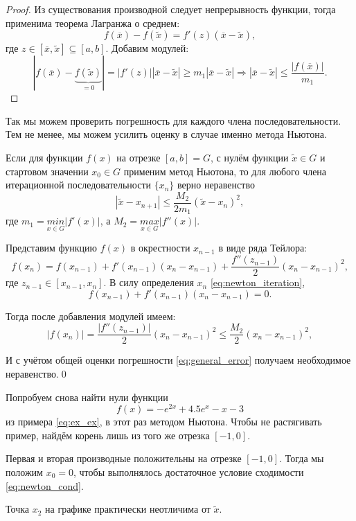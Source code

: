 \documentclass[../main.tex]{subfile}
\begin{document}
\begin{proof}
	Из существования производной следует непрерывность функции, тогда
	применима теорема Лагранжа о среднем:
	\[f(\overline{x})-f(\widetilde{x})=f'(z)(\overline{x}-\widetilde{x}),\]
	где $z\in[\overline{x},\widetilde{x}]\subseteq[a,b]$. Добавим модулей:
	\[|f(\overline{x})-\underset{=0}{\underbrace{f(\widetilde{x})}}|=|f'(z)|
		|\overline{x}-\widetilde{x}|\ge m_1|\overline{x}-\widetilde{x}|
		\Rightarrow |\overline{x}-\widetilde{x}|\le
		\frac{|f(\overline{x})|}{m_1}.\]
\end{proof}

Так мы можем проверить погрешность для каждого члена последовательности. Тем не
менее, мы можем усилить оценку в случае именно метода Ньютона.

\begin{theorem}
	Если для функции $f(x)$ на отрезке $[a,b]=G$, с нулём функции
	$\widetilde{x}\in G$ и стартовом значении $x_0\in G$ применим метод
	Ньютона, то для любого члена итерационной последовательности $\{x_n\}$
	верно неравенство
	\[\boxed{|\widetilde{x}-x_{n+1}|\le \frac{M_2}{2m_1}
	(\widetilde{x}-x_n)^2},\]
	где $m_1=\underset{x\in G}{min}|f'(x)|$, а $M_2=\underset{x\in G}{max}
	|f''(x)|$.
\end{theorem}

\beginproof

	Представим функцию $f(x)$ в окрестности $x_{n-1}$ в виде ряда Тейлора:
	\[f(x_n)=f(x_{n-1})+f'(x_{n-1})(x_n-x_{n-1})+\frac{f''(z_{n-1})}{2}
	(x_n-x_{n-1})^2,\]
	где $z_{n-1}\in[x_{n-1},x_n]$. В силу определения $x_n$
	\eqref{eq:newton_iteration},
	\[f(x_{n-1})+f'(x_{n-1})(x_n-x_{n-1})=0.\]

	Тогда после добавления модулей имеем:
	\[|f(x_n)|=\frac{|f''(z_{n-1})|}{2}(x_n-x_{n-1})^2\le \frac{M_2}{2}
	(x_n-x_{n-1})^2,\]

	И с учётом общей оценки погрешности \eqref{eq:general_error} получаем
	необходимое неравенство.\qed

\begin{example}
	Попробуем снова найти нули функции
	\[f(x)=-e^{2x}+4.5e^x-x-3\]
	из примера \eqref{eq:ex_ex}, в этот раз методом Ньютона. Чтобы не
	растягивать пример, найдём корень лишь из того же отрезка $[-1,0]$.

	Первая и вторая производные положительны на отрезке $[-1,0]$. Тогда
	мы положим $x_0=0$, чтобы выполнялось достаточное условие сходимости
	\eqref{eq:newton_cond}.
	\newline

	

	Точка $x_2$ на графике практически неотличима от $\widetilde{x}$.
\end{example}
\end{document}
